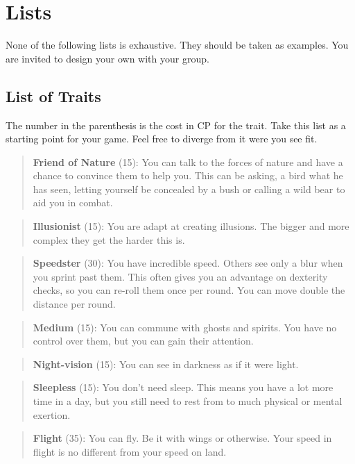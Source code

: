 \documentclass[11pt]{article}
\begin{document}
{\section{Lists}
\label{sec:orga8b790d}
None of the following lists is exhaustive. They should be taken as examples. You are invited to design your own with your group.
\subsection{List of Traits}
\label{sec:org519536e}
The number in the parenthesis is the cost in CP for the trait. Take this list as a starting point for your game. Feel free to diverge from it were you see fit.

\begin{quote}
\textbf{Friend of Nature} (15): You can talk to the forces of nature and have a chance to convince them to help you. This can be asking, a bird what he has seen, letting yourself be concealed by a bush or calling a wild bear to aid you in combat.
\end{quote}

\begin{quote}
\textbf{Illusionist} (15): You are adapt at creating illusions. The bigger and more complex they get the harder this is.
\end{quote}

\begin{quote}
\textbf{Speedster} (30): You have incredible speed. Others see only a blur when you sprint past them. This often gives you an advantage on dexterity checks, so you can re-roll them once per round. You can move double the distance per round.
\end{quote}

\begin{quote}
\textbf{Medium} (15): You can commune with ghosts and spirits. You have no control over them, but you can gain their attention.
\end{quote}

\begin{quote}
\textbf{Night-vision} (15): You can see in darkness as if it were light.
\end{quote}

\begin{quote}
\textbf{Sleepless} (15): You don't need sleep. This means you have a lot more time in a day, but you still need to rest from to much physical or mental exertion.
\end{quote}

\begin{quote}
\textbf{Flight} (35): You can fly. Be it with wings or otherwise. Your speed in flight is no different from your speed on land.
\end{quote}

}
\end{document}
